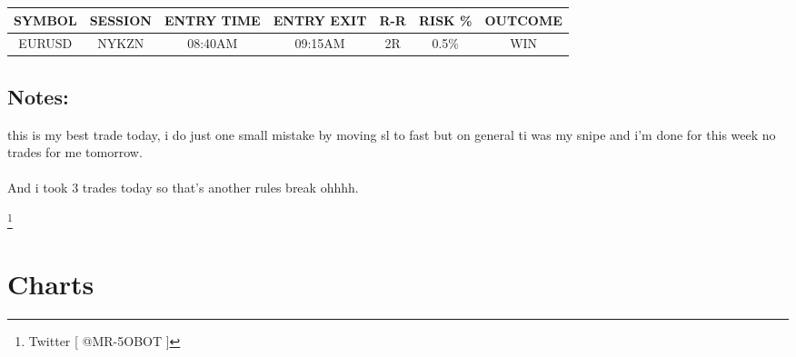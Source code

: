 \documentclass{article}
\begin{document}
\renewcommand{\arraystretch}{1.5} %
\setlength{\tabcolsep}{10pt} %

\begin{center}
\begin{tabular}{|c|c|c|c|c|c|c|}
  \hline
  SYMBOL & SESSION & ENTRY TIME & ENTRY EXIT & R-R & RISK \% & OUTCOME \\ 
  \hline 
  EURUSD & NYKZN & 08:40AM & 09:15AM & 2R & 0.5\% & WIN \\  
  \hline
\end{tabular}
\end{center}
\vspace{0.1cm}

\begin{notebox}
\subsection{Notes:}

\begin{notesbox}
\noindent this is my best trade today, i do just one small mistake by moving sl to fast but on general ti was my snipe and i'm done for this week no trades for me tomorrow. 
\\\\ And i took 3 trades today so that's another rules break ohhhh.
\end{notesbox}
\end{notebox}

\footnote{Twitter [ @MR-5OBOT ]}
\newpage

\vspace{0.4cm}

\section{Charts}
\end{document}
